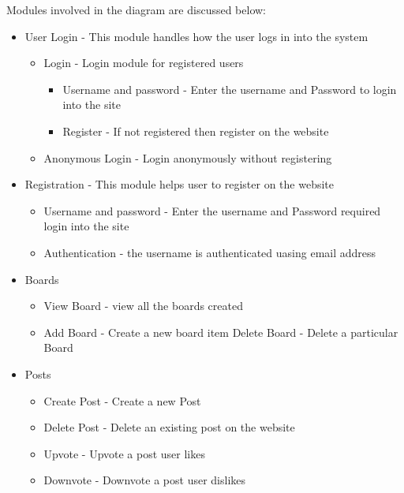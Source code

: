 \documentclass[12pt]{report}
\begin{document}
Modules involved in the diagram are discussed below:
\begin{itemize}
    \item User Login - This module handles how the user logs in into the system
    \begin{itemize}
        \item Login - Login module for registered users
        \begin{itemize}
            \item Username and password - Enter the username and Password to login into the site
            \item Register - If not registered then register on the website
        \end{itemize}
        \item Anonymous Login - Login anonymously without registering
    \end{itemize}
    \item Registration - This module helps user to register on the website
    \begin{itemize}
        \item Username and password - Enter the username and Password required login into the site
        \item Authentication - the username is authenticated uasing email address
    \end{itemize}
    \item Boards
    \begin{itemize}
        \item View Board - view all the boards created
        \item Add Board - Create a new board
        item Delete Board - Delete a particular Board
    \end{itemize}
    \item Posts
    \begin{itemize}
        \item Create Post - Create a new Post
        \item Delete Post - Delete an existing post on the website
        \item Upvote - Upvote a post user likes
        \item Downvote - Downvote a post user dislikes
    \end{itemize}
\end{itemize}
\end{document}
